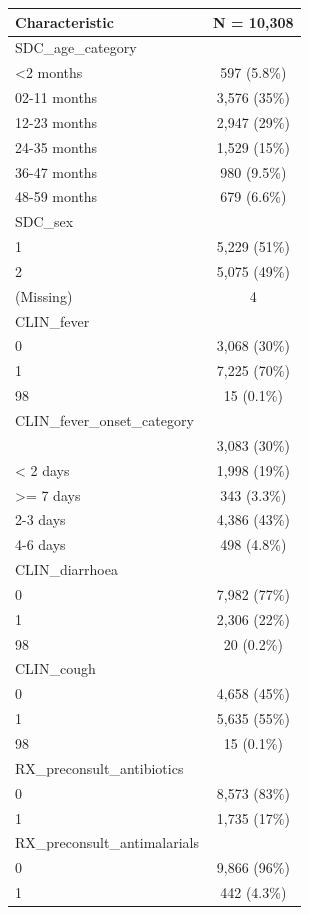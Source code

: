 \documentclass[
  letterpaper,
  DIV=11,
  numbers=noendperiod,
  oneside]{scrreprt}
\begin{document}
\begin{longtable}[]{@{}lc@{}}
\toprule()
\textbf{Characteristic} & \textbf{N = 10,308} \\
\midrule()
\endhead
SDC\_age\_category & \\
\textless2 months & 597 (5.8\%) \\
02-11 months & 3,576 (35\%) \\
12-23 months & 2,947 (29\%) \\
24-35 months & 1,529 (15\%) \\
36-47 months & 980 (9.5\%) \\
48-59 months & 679 (6.6\%) \\
SDC\_sex & \\
1 & 5,229 (51\%) \\
2 & 5,075 (49\%) \\
(Missing) & 4 \\
CLIN\_fever & \\
0 & 3,068 (30\%) \\
1 & 7,225 (70\%) \\
98 & 15 (0.1\%) \\
CLIN\_fever\_onset\_category & \\
& 3,083 (30\%) \\
\textless{} 2 days & 1,998 (19\%) \\
\textgreater= 7 days & 343 (3.3\%) \\
2-3 days & 4,386 (43\%) \\
4-6 days & 498 (4.8\%) \\
CLIN\_diarrhoea & \\
0 & 7,982 (77\%) \\
1 & 2,306 (22\%) \\
98 & 20 (0.2\%) \\
CLIN\_cough & \\
0 & 4,658 (45\%) \\
1 & 5,635 (55\%) \\
98 & 15 (0.1\%) \\
RX\_preconsult\_antibiotics & \\
0 & 8,573 (83\%) \\
1 & 1,735 (17\%) \\
RX\_preconsult\_antimalarials & \\
0 & 9,866 (96\%) \\
1 & 442 (4.3\%) \\
\bottomrule()
\end{longtable}
\end{document}
